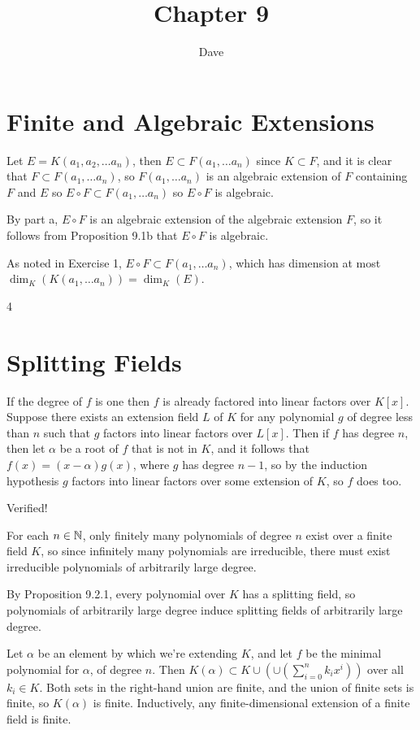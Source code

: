 \documentclass[11pt, oneside]{article}   	%
\title{Chapter 9}
\author{Dave}
\begin{document}
\maketitle
\section{Finite and Algebraic Extensions}
\be
\item Let $E = K(a_1, a_2, \ldots a_n)$, then $E \subset F(a_1, \ldots a_n)$ since $K \subset F$, and it is clear that $F \subset F(a_1, \ldots a_n)$, so $F(a_1, \ldots a_n)$ is an algebraic extension of $F$ containing $F$ and $E$ so $E \circ F \subset F(a_1, \ldots a_n)$ so $E \circ F$ is algebraic.
\item By part a, $E \circ F$ is an algebraic extension of the algebraic extension $F$, so it follows from Proposition 9.1b that $E \circ F$ is algebraic.
\item As noted in Exercise 1, $E \circ F \subset F(a_1, \ldots a_n)$, which has dimension at most $\dim_K(K(a_1, \ldots a_n)) = \dim_K(E)$.
\item 4
\ee
\section{Splitting Fields}
\be
\item If the degree of $f$ is one then $f$ is already factored into linear factors over $K[x]$. Suppose there exists an extension field $L$ of $K$ for any polynomial $g$ of degree less than $n$ such that $g$ factors into linear factors over $L[x]$. Then if $f$ has degree $n$, then let $\alpha$ be a root of $f$ that is not in $K$, and it follows that $f(x) = (x-\alpha)g(x)$, where $g$ has degree $n-1$, so by the induction hypothesis $g$ factors into linear factors over some extension of $K$, so $f$ does too.
\item Verified!
\item \be
\item For each $n \in \mathbb{N}$, only finitely many polynomials of degree $n$ exist over a finite field $K$, so since infinitely many polynomials are irreducible, there must exist irreducible polynomials of arbitrarily large degree.
\item By Proposition 9.2.1, every polynomial over $K$ has a splitting field, so polynomials of arbitrarily large degree induce splitting fields of arbitrarily large degree.
\item Let $\alpha$ be an element by which we're extending $K$, and let $f$ be the minimal polynomial for $\alpha$, of degree $n$. Then $K(\alpha) \subset K \cup (\cup(\sum_{i=0}^nk_ix^i))$  over all $k_i \in K$. Both sets in the right-hand union are finite, and the union of finite sets is finite, so $K(\alpha)$ is finite. Inductively, any finite-dimensional extension of a finite field is finite.
\ee
\ee
\end{document}
